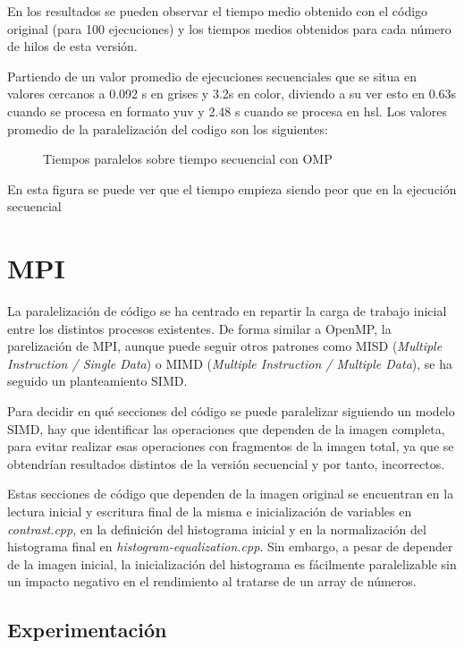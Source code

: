 \documentclass[12pt]{report} %
\begin{document}
En los resultados se pueden observar el tiempo medio obtenido con el código original (para 100 ejecuciones)
y los tiempos medios obtenidos para cada número de hilos de esta versión. 

Partiendo de un valor promedio de ejecuciones secuenciales que se situa en valores cercanos a 0.092 s en grises
y 3.2s en color, diviendo a su ver esto en 0.63s cuando se procesa en formato yuv y 2.48 s cuando se procesa
en hsl. Los valores promedio de la paralelización del codigo son los siguientes:

\begin{figure}[H]
    \caption{Tiempos paralelos sobre tiempo secuencial con OMP}
    \label{fig:fig_omp_grey}
\end{figure}

En esta figura se puede ver que el tiempo empieza siendo peor que en la ejecución secuencial

\section{MPI}
\label{sec:MPI}

La paralelización de código se ha centrado en repartir la carga de trabajo inicial entre los distintos
procesos existentes. De forma similar a OpenMP, la parelización de MPI, aunque puede seguir otros
patrones como MISD (\textit{Multiple Instruction / Single Data}) o MIMD (\textit{Multiple Instruction
/ Multiple Data}), se ha seguido un planteamiento SIMD.

Para decidir en qué secciones del código se puede paralelizar siguiendo un modelo SIMD, hay que identificar
las operaciones que dependen de la imagen completa, para evitar realizar esas operaciones con fragmentos de
la imagen total, ya que se obtendrían resultados distintos de la versión secuencial y por tanto, incorrectos.

Estas secciones de código que dependen de la imagen original se encuentran en la lectura inicial y escritura
final de la misma e inicialización de variables en \textit{contrast.cpp}, en la definición del histograma
inicial y en la normalización del histograma final en \textit{histogram-equalization.cpp}. Sin embargo,
a pesar de depender de la imagen inicial, la inicialización del histograma es fácilmente paralelizable sin
un impacto negativo en el rendimiento al tratarse de un array de números.


\subsection{Experimentación}
\end{document}
